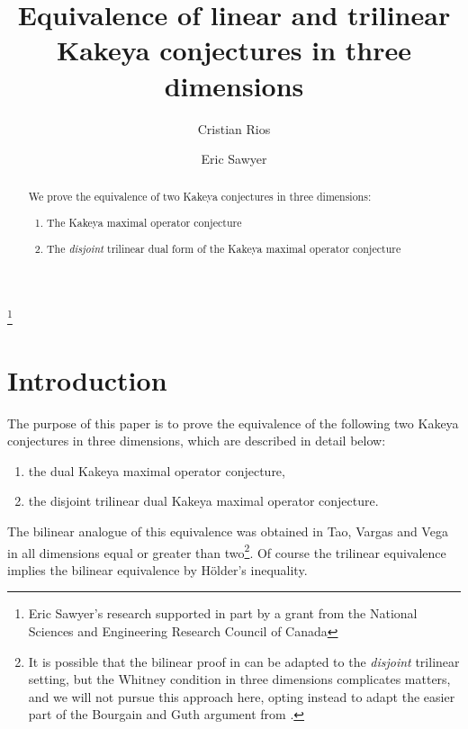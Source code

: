 \documentclass{amsart}%
\theoremstyle{plain}
\numberwithin{equation}{section}
\begin{document}
\title[Kakeya conjectures]{Equivalence of linear and trilinear Kakeya conjectures in three dimensions}
\author{Cristian Rios}
\address{University of Calgary\\
Calgary, Alberta, Canada}
\author{Eric Sawyer}
\address{McMaster University\\
Hamilton, Ontario, Canada}
\thanks{Eric Sawyer's research supported in part by a grant from the National Sciences
and Engineering Research Council of Canada}
\maketitle

\begin{abstract}
We prove the equivalence of two Kakeya conjectures in three dimensions:

\begin{enumerate}
\item The Kakeya maximal operator conjecture

\item The \emph{disjoint} trilinear dual form of the Kakeya maximal operator conjecture

\end{enumerate}
\end{abstract}
\tableofcontents


\section{Introduction}

The purpose of this paper is to prove the equivalence of the following two
Kakeya conjectures in three dimensions, which are described in detail below:

\begin{enumerate}
\item the dual Kakeya maximal operator conjecture,

\item the disjoint trilinear dual Kakeya maximal operator conjecture.
\end{enumerate}

The bilinear analogue of this equivalence was obtained in Tao, Vargas and Vega
\cite[Theorem 3.1]{TaVaVe} in all dimensions equal or greater than
two\footnote{It is possible that the bilinear proof in \cite{TaVaVe} can be
adapted to the \emph{disjoint} trilinear setting, but the Whitney condition in
three dimensions complicates matters, and we will not pursue this approach
here, opting instead to adapt the easier part of the Bourgain and Guth
argument from \cite[Section 2]{BoGu}.}. Of course the trilinear equivalence
implies the bilinear equivalence by H\"{o}lder's inequality.
\end{document}
